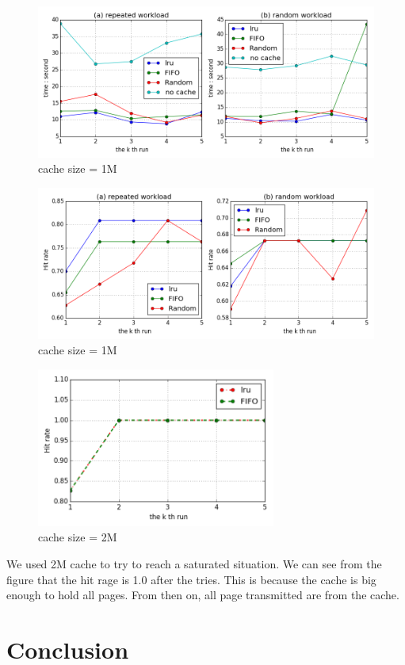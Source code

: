 \documentclass[paper=a4, fontsize=11pt]{scrartcl} %
\numberwithin{equation}{section} %
\numberwithin{figure}{section} %
\numberwithin{table}{section} %
\begin{document}
\begin{figure}[h]
  \centering
  \includegraphics[width=\textwidth]{../data/time1M}
  \caption{cache size = 1M}
  \label{fig:time1M}
\end{figure}
\begin{figure}[h]
  \centering
  \includegraphics[width=\textwidth]{../data/hit1M}
  \caption{cache size = 1M}
  \label{fig:hit1M}
\end{figure}
\begin{figure}[h]
  \centering
  \includegraphics[width=0.7\textwidth]{../data/hit2M}
  \caption{cache size = 2M}
  \label{fig:time2M}
\end{figure}
We used 2M cache to try to reach a saturated situation. We can see from the figure that the hit rage is 1.0 after the tries. This is because the cache is big enough to hold all pages. From then on, all page transmitted are from the cache. 
\section{Conclusion}
\end{document}
